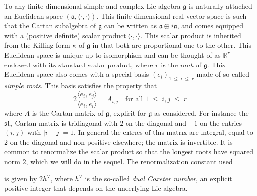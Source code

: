 \documentclass[AHL,Unicode,longabstracts,published]{cedram}
\renewcommand{\leq}{\;\leqslant\;}
\newcommand{\frksl}{\mathfrak{sl}}
\newcommand{\frkg}{\mathfrak{g}}
\newcommand{\frka}{\mathfrak{a}}
\newcommand{\R}{\mathbb{R}}
\newcommand{\ps}[1]{\langle #1 \rangle}
\begin{document}
To any finite-dimensional simple and complex Lie algebra $\frkg$ is naturally attached an Euclidean space $(\frka,\ps{\cdot,\cdot})$. This finite-dimensional real vector space is such that the Cartan subalgebra of $\frkg$ can be written as $\frka\oplus i\frka$, and comes equipped with a (positive definite) scalar product $\ps{\cdot,\cdot}$. This scalar product is inherited from the Killing form $\kappa$ of $\frkg$ in that both are proportional one to the other. This Euclidean space is unique up to isomorphism and can be thought of as $\R^r$ endowed with its standard scalar product, where $r$ is the \emph{rank} of $\frkg$. This Euclidean space also comes with a special basis $(e_i)_{1\leq i\leq r}$ made of so-called \emph{simple roots}. This basis satisfies the property that
\begin{equation}
2\frac{\ps{e_i,e_j}}{\ps{e_i,e_i}}=A_{i,j} \quad\text{for all }1\leq i,j\leq r
\end{equation}
where $A$ is the Cartan matrix of $\frkg$, explicit for $\frkg$ as considered. For instance the $\frksl_n$ Cartan matrix is tridiagonal with $2$ on the diagonal and $-1$ on the entries $(i,j)$ with $|i-j|=1$. In general the entries of this matrix are integral, equal to $2$ on the diagonal and non-positive elsewhere; the matrix is invertible. It is common to renormalize the scalar product so that the longest roots have squared norm $2$, which we will do in the sequel. The renormalization constant used

is given by $2h^\vee$, where $h^\vee$ is the so-called \emph{dual Coxeter number}, an explicit positive integer that depends on the underlying Lie algebra.
\end{document}
